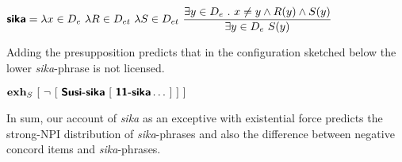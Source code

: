 \documentclass[output=paper,colorlinks,citecolor=brown,
]{langscibook}
\let\l\lambda
\def\M#1{\textsc{#1}}
\def\exh{\ifmmode\mathop{\textbf{exh}}\else\textbf{exh}\xspace\fi}
\begin{document}
\ea \label{syex:sikarev} 
  $\displaystyle \textsb{sika} = \l x \in D_e\ \l R \in D_{et}\ \l S \in D_{et}\ \frac{\exists y \in D_e\ .\ x \neq y \land R(y) \land S(y)}{\exists y \in D_e\ S(y)}$\z

Adding the presupposition predicts that in the configuration sketched below the lower \emph{sika}-phrase is not licensed.

\ea $\exh_S\ [\ \neg\ [\  \textsb{Susi-sika}\  [\ \textsb{11-sika} \dots\ ]\ ]\ ]$ \z

In sum, our account of \emph{sika} as an exceptive with existential force predicts the strong-NPI distribution of \emph{sika}-phrases and also the difference between negative concord items and \emph{sika}-phrases. 














   
\end{document}
